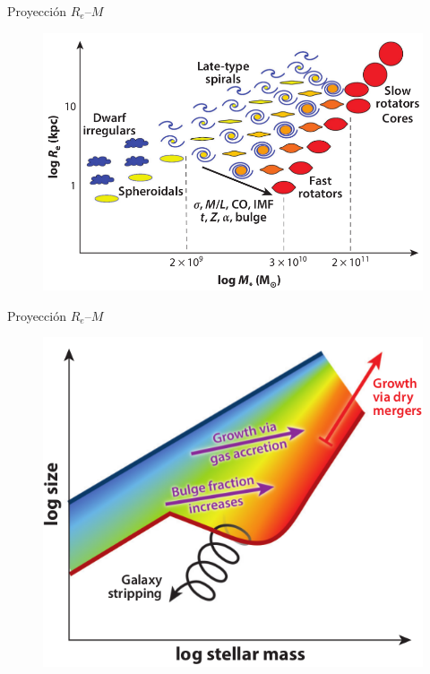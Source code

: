 \documentclass[xcolor=dvipsnames,4pt]{beamer}
\newenvironment{changemargin}[2]{%
  \begin{list}{}{%
    \setlength{\topsep}{0pt}%
    \setlength{\leftmargin}{#1}%
    \setlength{\rightmargin}{#2}%
    \setlength{\listparindent}{\parindent}%
    \setlength{\itemindent}{\parindent}%
    \setlength{\parsep}{\parskip}%
  }%
\item[]}{\end{list}}
\begin{document}
\begin{frame}{Proyección $R_e$--$M$}
\begin{changemargin}{-1cm}{-1cm}
\begin{figure}
\includegraphics[scale=0.75]{img/r_m_esquema.png}
\end{figure}
\end{changemargin}
\end{frame}

\begin{frame}{Proyección $R_e$--$M$}
\begin{changemargin}{-1cm}{-1cm}
\begin{figure}
\centering
\includegraphics[scale=0.8]{img/size_mass_esquema.png}
\end{figure}
\end{changemargin}
\end{frame}
\end{document}
